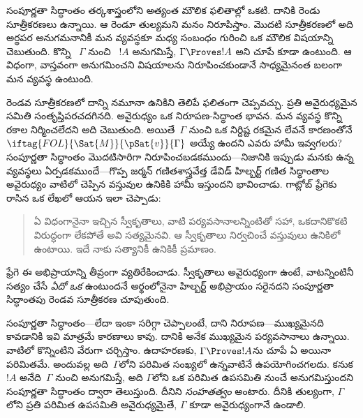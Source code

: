 \documentclass[../../../include/open-logic-section]{subfiles}
\begin{document}
      {}
      {}


సంపూర్ణతా సిద్ధాంతం తర్కశాస్త్రంలోని అత్యంత మౌలిక ఫలితాల్లో ఒకటి.
దానికి రెండు సూత్రీకరణలు ఉన్నాయి. ఆ రెండూ తుల్యమని మనం
నిరూపిస్తాం. మొదటి సూత్రీకరణలో అది అర్థపర అనుగమనానికీ మన
 వ్యవస్థకూ మధ్య సంబంధం గురించి ఒక మౌలిక విషయాన్ని
చెబుతుంది. కొన్ని ~$\Gamma$ నుంచి ~$!A$
అనుగమిస్తే, $\Gamma \Proves !A$ అని చూపే  కూడా
ఉంటుంది. ఆ విధంగా, వాస్తవంగా అనుగమించని విషయాలను నిరూపించకుండానే
సాధ్యమైనంత బలంగా మన  వ్యవస్థ ఉంటుంది.

రెండవ సూత్రీకరణలో దాన్ని నమూనా ఉనికిని తెలిపే ఫలితంగా చెప్పవచ్చు. ప్రతి
అవైరుధ్యమైన  సమితి సంతృప్తిపరచదగినది. అవైరుధ్యం ఒక
నిరూపణ-సిద్ధాంత భావన. మన  వ్యవస్థ కొన్ని రకాల
 నిర్మించలేదని అది చెబుతుంది. అయితే~$\Gamma$
నుంచి ఒక నిర్దిష్ట రకమైన  లేవనే కారణంతోనే
$\iftag{FOL}{\Sat{M}}{\pSat{v}}{\Gamma}$ అయ్యే
ఉందని ఎవరు హామీ ఇవ్వగలరు? సంపూర్ణతా సిద్ధాంతం మొదటిసారిగా
నిరూపించబడకముందు---నిజానికి ఇప్పుడు మనకు ఉన్న 
వ్యవస్థలు ఏర్పడకముందే---గొప్ప జర్మన్ గణితశాస్త్రవేత్త డేవిడ్
హిల్బర్ట్ గణిత సిద్ధాంతాల అవైరుధ్యం వాటిలో చెప్పిన వస్తువుల ఉనికికి
హామీ ఇస్తుందని భావించాడు. గాట్లోబ్ ఫ్రేగెకు రాసిన ఒక లేఖలో ఆయన
ఇలా చెప్పాడు:
\begin{quote}
  ఏ విధంగానైనా ఇచ్చిన స్వీకృతాలు, వాటి పర్యవసానాలన్నింటితో సహా,
  ఒకదానికొకటి విరుద్ధంగా లేకపోతే అవి సత్యమైనవి. ఆ స్వీకృతాలు నిర్వచించే
  వస్తువులు ఉనికిలో ఉంటాయి. ఇదే నాకు సత్యానికీ ఉనికికీ ప్రమాణం.
\end{quote}
ఫ్రేగె ఈ అభిప్రాయాన్ని తీవ్రంగా వ్యతిరేకించాడు. స్వీకృతాలు అవైరుధ్యంగా ఉంటే,
వాటన్నింటినీ సత్యం చేసే \emph{ఏదో ఒక}
 ఉంటుందనే అర్థంలోనైనా
హిల్బర్ట్ అభిప్రాయం సరైనదని సంపూర్ణతా సిద్ధాంతపు రెండవ సూత్రీకరణ చూపుతుంది.

సంపూర్ణతా సిద్ధాంతం---లేదా ఇంకా సరిగ్గా చెప్పాలంటే, దాని
నిరూపణ---ముఖ్యమైనది కావడానికి ఇవి మాత్రమే కారణాలు కావు. దానికి అనేక
ముఖ్యమైన పర్యవసానాలు ఉన్నాయి. వాటిలో కొన్నింటిని వేరుగా చర్చిస్తాం.
ఉదాహరణకు, $\Gamma \Proves !A$ను చూపే ఏ  అయినా పరిమితమే.
అందువల్ల అది~$\Gamma$లోని  పరిమిత సంఖ్యలో ఉన్నవాటినే
ఉపయోగించగలదు. కనుక~$!A$ అనేది~$\Gamma$ నుంచి అనుగమిస్తే, అది
$\Gamma$లోని ఒక పరిమిత ఉపసమితి నుంచే అనుగమిస్తుందని సంపూర్ణతా సిద్ధాంతం
ద్వారా తెలుస్తుంది. దీనిని \emph{సంహతత్వం} అంటారు. దీనికి తుల్యంగా,
$\Gamma$లోని ప్రతి పరిమిత ఉపసమితి అవైరుధ్యమైతే, $\Gamma$ కూడా
అవైరుధ్యంగానే ఉండాలి.
\end{document}

